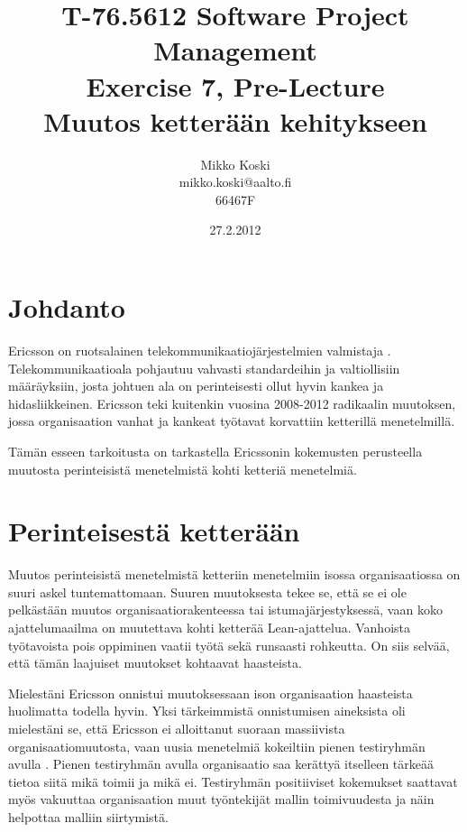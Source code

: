 \documentclass[a4paper]{article}
\begin{document}
\title{\small T-76.5612 Software Project Management \\ Exercise 7, Pre-Lecture \\ \huge Muutos ketterään kehitykseen}
\date{27.2.2012}
\author{Mikko Koski \\ mikko.koski@aalto.fi \\ 66467F}
\maketitle

\normalsize

\section{Johdanto}

Ericsson on ruotsalainen telekommunikaatiojärjestelmien valmistaja \citep{wikiericsson}. Telekommunikaatioala pohjautuu vahvasti standardeihin ja valtiollisiin määräyksiin, josta johtuen ala on perinteisesti ollut hyvin kankea ja hidasliikkeinen. Ericsson teki kuitenkin vuosina 2008-2012 radikaalin muutoksen, jossa organisaation vanhat ja kankeat työtavat korvattiin ketterillä menetelmillä. \citep{mikkonen2011}

Tämän esseen tarkoitusta on tarkastella Ericssonin kokemusten perusteella muutosta perinteisistä menetelmistä kohti ketteriä menetelmiä.

\section{Perinteisestä ketterään}

Muutos perinteisistä menetelmistä ketteriin menetelmiin isossa organisaatiossa on suuri askel tuntemattomaan. Suuren muutoksesta tekee se, että se ei ole pelkästään muutos organisaatiorakenteessa tai istumajärjestyksessä, vaan koko ajattelumaailma on muutettava kohti ketterää Lean-ajattelua. Vanhoista työtavoista pois oppiminen vaatii työtä sekä runsaasti rohkeutta. On siis selvää, että tämän laajuiset muutokset kohtaavat haasteista.

Mielestäni Ericsson onnistui muutoksessaan ison organisaation haasteista huolimatta todella hyvin. Yksi tärkeimmistä onnistumisen aineksista oli mielestäni se, että Ericsson ei alloittanut suoraan massiivista organisaatiomuutosta, vaan uusia menetelmiä kokeiltiin pienen testiryhmän avulla \citep{mikkonen2011}. Pienen testiryhmän avulla organisaatio saa kerättyä itselleen tärkeää tietoa siitä mikä toimii ja mikä ei. Testiryhmän positiiviset kokemukset saattavat myös vakuuttaa organisaation muut työntekijät mallin toimivuudesta ja näin helpottaa malliin siirtymistä.
\end{document}
